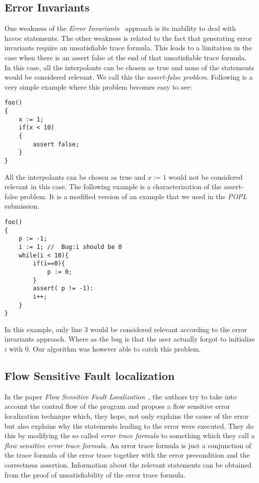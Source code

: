 \documentclass{article}
\begin{document}
\subsection{Error Invariants}
One weakness of the \textit{Error Invariants}~\cite{fm/ErmisSW12} approach is its inability to deal with havoc statements. The other weakness is related to the fact that generating error invariants require an unsatisfiable trace formula. This leads to a limitation in the case when there is an assert false at the end of that unsatisfiable trace formula. In this case, all the interpolants can be chosen as true and none of the statements would be considered relevant. We call this the \textit{assert-false problem}. Following is a very simple example where this problem becomes easy to see:
\begin{lstlisting}
foo()
{ 
	x := 1;
	if(x < 10)
	{
		assert false;	
	}	
}
\end{lstlisting}
All the interpolants can be chosen as true and $x:=1$ would not be considered relevant in this case. The following example is a characterization of the assert-false problem. It is a modified version of an example that we used in the \textit{POPL} submission.
\begin{lstlisting}
foo()
{ 
	p := -1;
	i := 1; //  Bug:i should be 0
	while(i < 10){
		if(i==0){
			p := 0;		
		}
		assert( p != -1):
		i++;	
	}
}
\end{lstlisting}
In this example, only line 3 would be considered relevant according to the error invariants approach. Where as the bug is that the user actually forgot to initialize $i$ with 0. Our algorithm was however able to catch this problem.

\subsection{Flow Sensitive Fault localization} 
In the paper \textit{Flow Sensitive Fault Localization}~\cite{vmcai/ChristESW13}, the authors try to take into account the control flow of the program and propose a flow sensitive error localization technique which, they hope, not only explains the cause of the error but also explains why the statements leading to the error were executed. They do this by modifying the so called \textit{error trace formula} to something which they call a \textit{flow sensitive error trace formula}. An error trace formula is just a conjunction of the trace formula of the error trace together with the error precondition and the correctness assertion. Information about the relevant statements can be obtained from the proof of unsatisfiability of the error trace formula.
\end{document}
